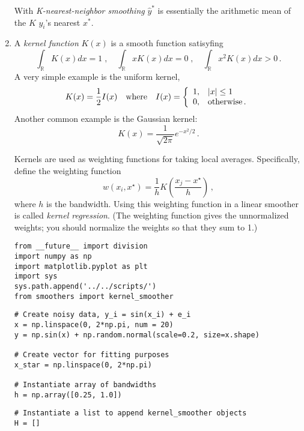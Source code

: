 \documentclass[10pt]{article}
\begin{document}
\begin{enumerate}[label=(\Alph*)]
        With \textit{K-nearest-neighbor smoothing} $\hat{y}^*$ is essentially the arithmetic mean of the $K$ $y_i$'s nearest $x^*$. 

      \item A \textit{kernel function} $K(x)$ is a smooth function satisyfing
        $$
        \int_\mathbb{R} K(x) dx = 1 \; , \quad \int_\mathbb{R} x K(x) dx = 0 \; , \quad \int_\mathbb{R} x^2 K(x) dx > 0 \, .
        $$
        A very simple example is the uniform kernel,
        $$
        K(x) = \frac{1}{2} I(x) \quad \mbox{where} \quad I(x) = 
        \left\{
        \begin{array}{l l}
        1, & |x| \leq 1 \\
        0, & \mbox{otherwise} \, . \\
        \end{array}
        \right.
        $$
        Another common example is the Gaussian kernel:
        $$
        K(x) = \frac{1}{\sqrt{2 \pi}} e^{-x^2/2} \, .
        $$

        Kernels are used as weighting functions for taking local averages.  Specifically, define the weighting function
        $$
        w(x_i, x^{\star}) = \frac{1}{h} K \left( \frac{x_j - x^{\star}}{h} \right)  \, ,
        $$
        where $h$ is the bandwidth.    Using this weighting function in a linear smoother is called \textit{kernel regression}.  (The weighting function gives the unnormalized weights; you should normalize the weights so that they sum to 1.)

        \begin{lstlisting}
from __future__ import division
import numpy as np 
import matplotlib.pyplot as plt
import sys
sys.path.append('../../scripts/')
from smoothers import kernel_smoother
        \end{lstlisting}

        \begin{lstlisting}
# Create noisy data, y_i = sin(x_i) + e_i
x = np.linspace(0, 2*np.pi, num = 20)
y = np.sin(x) + np.random.normal(scale=0.2, size=x.shape)

# Create vector for fitting purposes
x_star = np.linspace(0, 2*np.pi)

# Instantiate array of bandwidths
h = np.array([0.25, 1.0])
        \end{lstlisting}

        \begin{lstlisting}
# Instantiate a list to append kernel_smoother objects
H = []


\end{lstlisting}
\end{enumerate}
\end{document}
